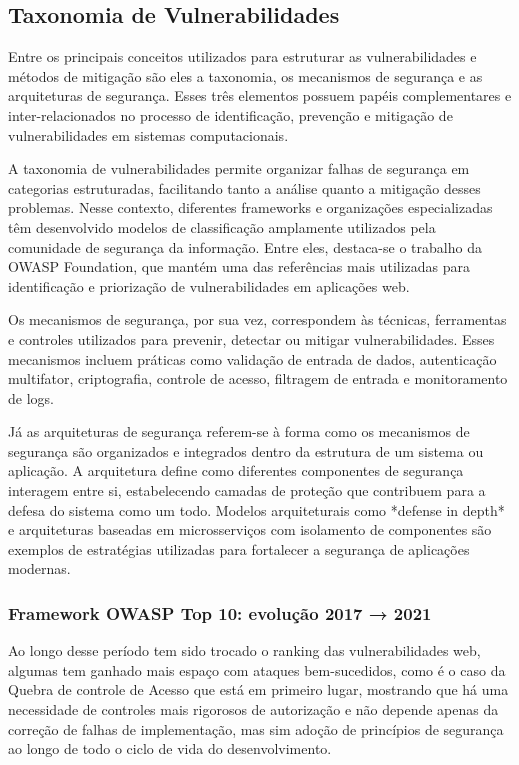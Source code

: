 \subsection{
    Taxonomia de Vulnerabilidades
} \label{sec:vulnerabilities_taxonomy}

Entre os principais conceitos utilizados para estruturar as vulnerabilidades e métodos de mitigação são eles a taxonomia, os mecanismos de segurança e as arquiteturas de segurança. Esses três elementos possuem papéis complementares e inter-relacionados no processo de identificação, prevenção e mitigação de vulnerabilidades em sistemas computacionais.  

A taxonomia de vulnerabilidades permite organizar falhas de segurança em categorias estruturadas, facilitando tanto a análise quanto a mitigação desses problemas. Nesse contexto, diferentes frameworks e organizações especializadas têm desenvolvido modelos de classificação amplamente utilizados pela comunidade de segurança da informação. Entre eles, destaca-se o trabalho da OWASP Foundation, que mantém uma das referências mais utilizadas para identificação e priorização de vulnerabilidades em aplicações web. 

Os mecanismos de segurança, por sua vez, correspondem às técnicas, ferramentas e controles utilizados para prevenir, detectar ou mitigar vulnerabilidades. Esses mecanismos incluem práticas como validação de entrada de dados, autenticação multifator, criptografia, controle de acesso, filtragem de entrada e monitoramento de logs.

Já as arquiteturas de segurança referem-se à forma como os mecanismos de segurança são organizados e integrados dentro da estrutura de um sistema ou aplicação. A arquitetura define como diferentes componentes de segurança interagem entre si, estabelecendo camadas de proteção que contribuem para a defesa do sistema como um todo. Modelos arquiteturais como *defense in depth* e arquiteturas baseadas em microsserviços com isolamento de componentes são exemplos de estratégias utilizadas para fortalecer a segurança de aplicações modernas. 


\subsubsection{
    Framework OWASP Top 10: evolução 2017 → 2021
}

Ao longo desse período tem sido trocado o ranking das vulnerabilidades web, algumas tem ganhado mais espaço com ataques bem-sucedidos, como é o caso da Quebra de controle de Acesso que está em primeiro lugar, mostrando que há uma necessidade de controles mais rigorosos de autorização e não depende apenas da correção de falhas de implementação, mas sim adoção de princípios de segurança ao longo de todo o ciclo de vida do desenvolvimento. 

